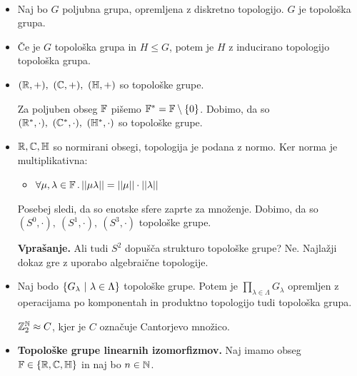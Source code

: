 \begin{primer} \
    \begin{itemize}
        \item Naj bo \(G\) poljubna grupa, opremljena z diskretno topologijo. \(G\) je topološka grupa.
        \item Če je \(G\) topološka grupa in \(H \leq G\), potem je \(H\) z inducirano topologijo topološka grupa.
        \item \((\mathbb{R}, +), \ (\mathbb{C}, +), \ (\mathbb{H}, +)\) so topološke grupe.
        
        Za poljuben obseg \(\mathbb{F}\) pišemo \(\mathbb{F}^* = \mathbb{F} \setminus \left\{0\right\}\). Dobimo, da so \((\mathbb{R}^*, \cdot), \ (\mathbb{C}^*, \cdot), \ (\mathbb{H}^*, \cdot)\) so topološke grupe.
        \item \(\mathbb{R}, \mathbb{C}, \mathbb{H}\) so normirani obsegi, topologija je podana z normo. Ker norma je multiplikativna:
        \begin{itemize}
            \item \(\forall \mu, \lambda \in \mathbb{F} \,.\, ||\mu \lambda|| = ||\mu|| \cdot ||\lambda||\)
        \end{itemize}
        Posebej sledi, da so enotske sfere zaprte za množenje. Dobimo, da so \((S^0, \cdot), \ (S^1, \cdot), \ (S^3, \cdot)\) topološke grupe.
        
        \textbf{Vprašanje.} Ali tudi \(S^2\) dopušča strukturo topološke grupe? Ne. Najlažji dokaz gre z uporabo algebraične topologije.
        \item Naj bodo \(\left\{G_\lambda \ | \ \lambda \in \Lambda\right\}\) topološke grupe. Potem je \(\prod_{\lambda \in \Lambda} G_\lambda\) opremljen z operacijama po komponentah in produktno topologijo tudi topološka grupa.
        \begin{primer}
            \(\mathbb{Z}_2^{\mathbb{N}} \approx C\), kjer je \(C\) označuje Cantorjevo množico.
        \end{primer}
        \item \textbf{Topološke grupe linearnih izomorfizmov.} Naj imamo obseg \(\mathbb{F} \in \left\{\mathbb{R}, \mathbb{C}, \mathbb{H}\right\}\) in naj bo \(n \in \mathbb{N}\).
        

\end{itemize}
\end{primer}
